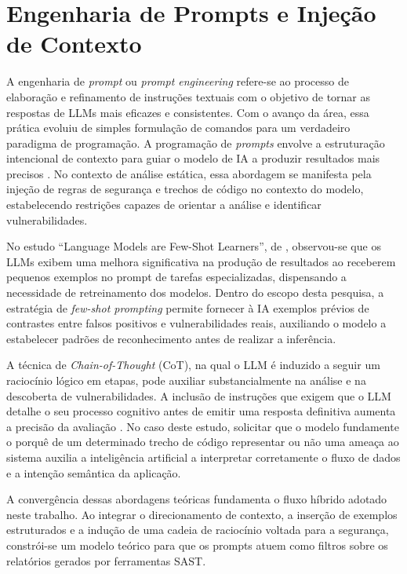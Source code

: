 \section{Engenharia de Prompts e Injeção de Contexto}
A engenharia de \textit{prompt} ou \textit{prompt engineering} refere-se ao processo de elaboração e refinamento de instruções textuais com o objetivo de tornar as respostas de LLMs mais eficazes e consistentes. Com o avanço da área, essa prática evoluiu de simples formulação de comandos para um verdadeiro paradigma de programação. A programação de \textit{prompts} envolve a estruturação intencional de contexto para guiar o modelo de IA a produzir resultados mais precisos \cite{reynolds2021promptprogramminglargelanguage}. No contexto de análise estática, essa abordagem se manifesta pela injeção de regras de segurança e trechos de código no contexto do modelo, estabelecendo restrições capazes de orientar a análise e identificar vulnerabilidades.

No estudo ``Language Models are Few-Shot Learners'', de , observou-se que os LLMs exibem uma melhora significativa na produção de resultados ao receberem pequenos exemplos no prompt de tarefas especializadas, dispensando a necessidade de retreinamento dos modelos. Dentro do escopo desta pesquisa, a estratégia de \textit{few-shot prompting} permite fornecer à IA exemplos prévios de contrastes entre falsos positivos e vulnerabilidades reais, auxiliando o modelo a estabelecer padrões de reconhecimento antes de realizar a inferência.

A técnica de \textit{Chain-of-Thought} (CoT), na qual o LLM é induzido a seguir um raciocínio lógico em etapas, pode auxiliar substancialmente na análise e na descoberta de vulnerabilidades. A inclusão de instruções que exigem que o LLM detalhe o seu processo cognitivo antes de emitir uma resposta definitiva aumenta a precisão da avaliação \cite{nong2024chainofthoughtpromptinglargelanguage}. No caso deste estudo, solicitar que o modelo fundamente o porquê de um determinado trecho de código representar ou não uma ameaça ao sistema auxilia a inteligência artificial a interpretar corretamente o fluxo de dados e a intenção semântica da aplicação.

A convergência dessas abordagens teóricas fundamenta o fluxo híbrido adotado neste trabalho. Ao integrar o direcionamento de contexto, a inserção de exemplos estruturados e a indução de uma cadeia de raciocínio voltada para a segurança, constrói-se um modelo teórico para que os prompts atuem como filtros sobre os relatórios gerados por ferramentas SAST.

